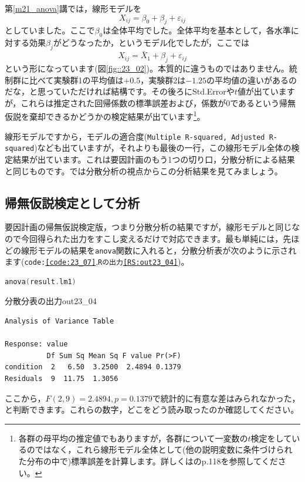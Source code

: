 \documentclass{ltjbook}
\begin{document}
第\ref{m21_anova}講では，線形モデルを
\[ X_{ij} = \beta_0 + \beta_j + \varepsilon_{ij} \]
としていました。ここで$\beta_0$は全体平均でした。全体平均を基本として，各水準に対する効果$\beta_j$がどうなったか，というモデル化でしたが，ここでは
\[ X_{ij} = \bar{X}_1 + \beta_j + \varepsilon_{ij} \]
という形になっています(図\ref{fig::23_02})。本質的に違うものではありません。統制群に比べて実験群1の平均値は$+0.5$，実験群2は$-1.25$の平均値の違いがあるのだな，と思っていただければ結構です。その後ろにStd.Errorや$t$値が出ていますが，これらは推定された回帰係数の標準誤差および，係数が$0$であるという帰無仮説を棄却できるかどうかの検定結果が出ています\footnote{各群の母平均の推定値でもありますが，各群について一変数の$t$検定をしているのではなく，これら線形モデル全体として(他の説明変数に条件づけられた分布の中で)標準誤差を計算します。詳しくは\textcite{Haebara200206}のp.118を参照してください。}。

線形モデルですから，モデルの適合度(\texttt{Multiple R-squared, Adjusted R-squared})なども出ていますが，それよりも最後の一行，この線形モデル全体の検定結果が出ています。これは要因計画のもう1つの切り口，分散分析による結果と同じものです。では分散分析の視点からこの分析結果を見てみましょう。

\subsection{帰無仮説検定として分析}
要因計画の帰無仮説検定版，つまり分散分析の結果ですが，線形モデルと同じなので今回得られた出力をすこし変えるだけで対応できます。最も単純には，先ほどの線形モデルの結果を\texttt{anova}関数に入れると，分散分析表が次のように示されます(\texttt{code:\ref{code:23_07}},\texttt{Rの出力\ref{RS:out23_04}})。


\begin{lstlisting}[language=c++,label={code:23_07},caption={分散分析としてみる}]
anova(result.lm1)
\end{lstlisting}


\begin{Rscreen}{分散分表の出力}{out23_04}
	\begin{verbatim}
Analysis of Variance Table

Response: value
          Df Sum Sq Mean Sq F value Pr(>F)
condition  2   6.50  3.2500  2.4894 0.1379
Residuals  9  11.75  1.3056   
\end{verbatim}
\end{Rscreen}
ここから，$F(2,9)=2.4894,p=0.1379$で統計的に有意な差はみられなかった，と判断できます。これらの数字，どこをどう読み取ったのか確認してください。
\end{document}
